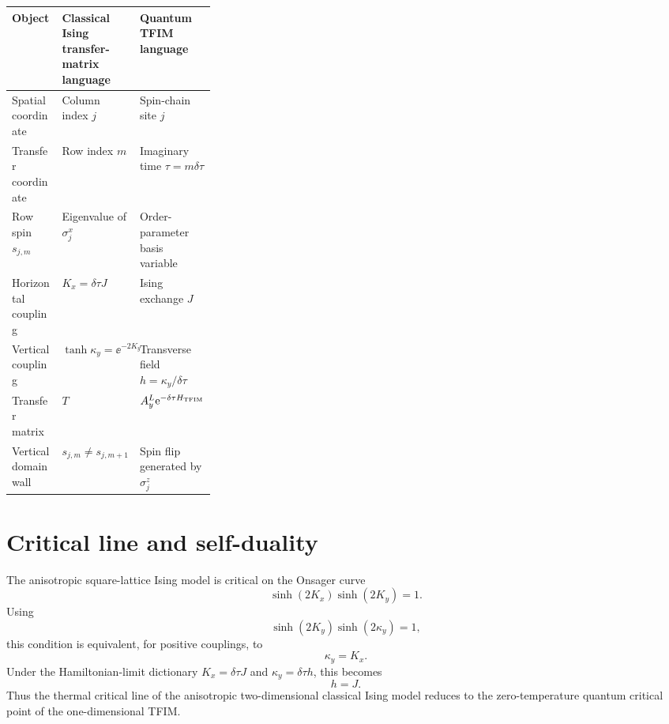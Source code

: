 \begin{center}
\begin{tabularx}{0.95\linewidth}{@{}L{0.30\linewidth}Y Y@{}}
\toprule
Object & Classical Ising transfer-matrix language & Quantum TFIM language \\
\midrule
Spatial coordinate & Column index $j$ & Spin-chain site $j$ \\
Transfer coordinate & Row index $m$ & Imaginary time $\tau=m\delta\tau$ \\
Row spin $s_{j,m}$ & Eigenvalue of $\sigma_j^x$ & Order-parameter basis variable \\
Horizontal coupling & $K_x=\delta\tau J$ & Ising exchange $J$ \\
Vertical coupling & $\tanh\kappa_y=\ee^{-2K_y}$ & Transverse field $h=\kappa_y/\delta\tau$ \\
Transfer matrix & $T$ & $A_y^L\mathrm{e}^{-\delta\tau H_{\rm TFIM}}$ \\
Vertical domain wall & $s_{j,m}\neq s_{j,m+1}$ & Spin flip generated by $\sigma_j^z$ \\
\bottomrule
\end{tabularx}
\end{center}

\section{Critical line and self-duality}
\label{sec:ising-tfim-critical-line-self-duality}

The anisotropic square-lattice Ising model is critical on the Onsager curve
\begin{equation}
\label{eq:ising-tfim-onsager-critical-line}
    \sinh(2K_x)\sinh(2K_y)=1 .
\end{equation}
Using
\begin{equation}
\label{eq:ising-tfim-kappa-duality-identity}
    \sinh(2K_y)\sinh(2\kappa_y)=1,
\end{equation}
this condition is equivalent, for positive couplings, to
\begin{equation}
\label{eq:ising-tfim-critical-kx-kappa}
    \kappa_y=K_x .
\end{equation}
Under the Hamiltonian-limit dictionary $K_x=\delta\tau J$ and
$\kappa_y=\delta\tau h$, this becomes
\begin{equation}
\label{eq:ising-tfim-critical-h-equals-j}
    h=J .
\end{equation}
Thus the thermal critical line of the anisotropic two-dimensional classical Ising
model reduces to the zero-temperature quantum critical point of the
one-dimensional TFIM.

